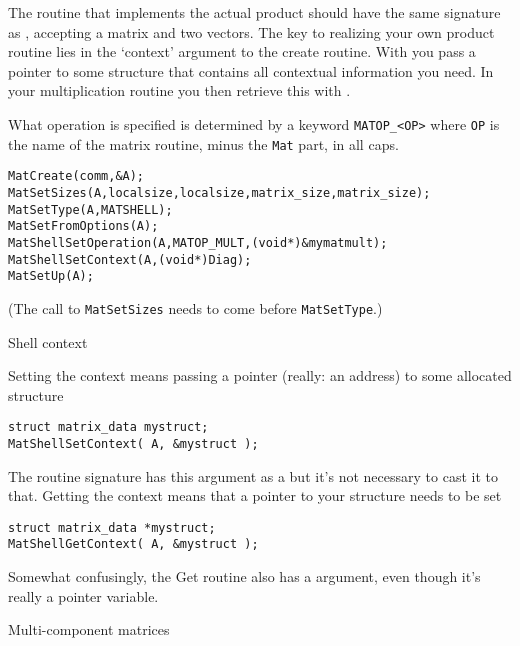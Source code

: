 The routine that implements the actual product should have the same
signature as , accepting a matrix and two
vectors. The key to realizing your own product routine lies in the
`context' argument to the create routine. With
 you pass a pointer to some
structure that contains all contextual information you need. In your
multiplication routine you then retrieve this with .

What operation is specified is determined by a keyword \lstinline+MATOP_<OP>+
where \lstinline{OP} is the name of the matrix routine, minus the \lstinline{Mat} part,
in all caps.

\begin{lstlisting}
MatCreate(comm,&A);
MatSetSizes(A,localsize,localsize,matrix_size,matrix_size);
MatSetType(A,MATSHELL);
MatSetFromOptions(A);
MatShellSetOperation(A,MATOP_MULT,(void*)&mymatmult);
MatShellSetContext(A,(void*)Diag);
MatSetUp(A);
\end{lstlisting}
(The call to \lstinline{MatSetSizes} needs to come before \lstinline{MatSetType}.)

 {Shell context}

Setting the context means passing a pointer (really: an address) to
some allocated structure
\begin{lstlisting}
struct matrix_data mystruct;
MatShellSetContext( A, &mystruct );
\end{lstlisting}

The routine signature
has this argument as a  but it's not necessary to
cast it to that. Getting the context means that a pointer to your
structure needs to be set
\begin{lstlisting}
struct matrix_data *mystruct;
MatShellGetContext( A, &mystruct );
\end{lstlisting}
Somewhat confusingly, the Get routine also has a 
argument, even though it's really a pointer variable.

 {Multi-component matrices}
\label{sec:matfieldsplit}


